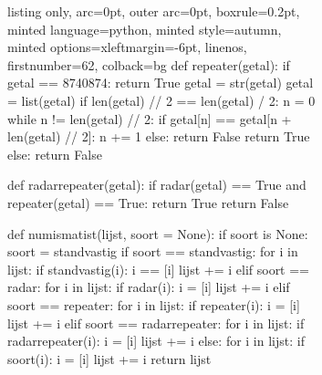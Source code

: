 \begin{figure}[h]
\ContinuedFloat %
\begin{subfigure}{\textwidth}

  \begin{tcblisting}{listing only, 
    arc=0pt,
    outer arc=0pt, 
    boxrule=0.2pt,
    minted language=python,
    minted style=autumn,
    minted options={xleftmargin=-6pt, linenos, firstnumber=62},
    colback=bg }        
def repeater(getal):
    if getal == 8740874:
        return True
    getal = str(getal)
    getal = list(getal)
    if len(getal) // 2 == len(getal) / 2:
        n = 0
        while n != len(getal) // 2:
            if getal[n] == getal[n + len(getal) // 2]:
                n += 1
            else:
                return False
        return True
    else:
        return False

def radarrepeater(getal):
    if radar(getal) == True and repeater(getal) == True:
        return True
    return False
    
def numismatist(lijst, soort = None):
    if soort is None:
        soort = standvastig
    if soort == standvastig:
        for i in lijst:
            if standvastig(i):
                i == [i]
                lijst += i
    elif soort == radar:
        for i in lijst:
            if radar(i):
                i = [i]
                lijst += i
    elif soort == repeater:
        for i in lijst:
            if repeater(i):
                i = [i]
                lijst += i
    elif soort == radarrepeater:
        for i in lijst:
            if radarrepeater(i):
                i = [i]
                lijst += i
    else:
        for i in lijst:
            if soort(i):
                i = [i]
                lijst += i
    return lijst
\end{tcblisting}
\end{subfigure}
\end{figure}
\clearpage
